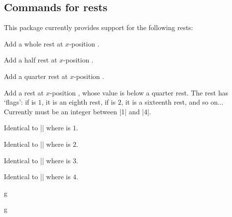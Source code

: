 \subsection{Commands for rests}\label{sec:music-notes:rests}
This package currently provides support for the following rests:
\begin{command}{\tmwholerest{}}
  Add a whole rest at $x$-position .
\end{command}
\begin{command}{\tmhalfrest{}}
  Add a half rest at $x$-position .
\end{command}
\begin{command}{\tmquarterrest{}}
  Add a quarter rest at $x$-position .
\end{command}
\begin{command}{\tmbelowquarterrest{}}
  Add a rest at $x$-position , whose value is below a quarter rest. 
  The rest has  `flags': if  is $1$, it is an eighth 
  rest, if  is $2$, it is a sixteenth rest, and so on... Currently 
   must be an integer between |1| and |4|.
\end{command}
\begin{command}{\tmeighthrest{}}
  Identical to |\tmbelowquarterrest| where  is $1$.
\end{command}
\begin{command}{\tmsixteenthrest{}}
  Identical to |\tmbelowquarterrest| where  is $2$.
\end{command}
\begin{command}{\tmthirtysecondrest{}}
  Identical to |\tmbelowquarterrest| where  is $3$.
\end{command}
\begin{command}{\tmsixtyfourthrest{}}
  Identical to |\tmbelowquarterrest| where  is $4$.
\end{command}
\begin{codeexample}[]
\begin{tmline}%
\begin{tmstaff}{g}{}
\end{tmstaff}%
\begin{tmstaff}{g}{}
\end{tmstaff}%
\end{tmline}
\end{codeexample}
